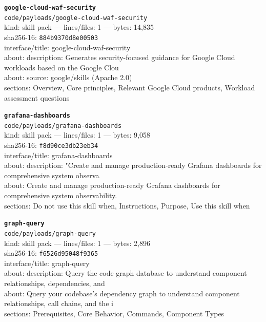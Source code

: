 \noindent\textbf{\texttt{google-cloud-waf-security}}\\
\texttt{code/payloads/google-cloud-waf-security}\\
kind: skill pack --- lines/files: 1 --- bytes: 14,835\\
sha256-16: \texttt{884b9370d8e00503}\\
interface/title: google-cloud-waf-security\\
about: description: Generates security-focused guidance for Google Cloud workloads based on the Google Clou\\
about: source: google/skills (Apache 2.0)\\
sections: Overview, Core principles, Relevant Google Cloud products, Workload assessment questions\\
\vspace*{6.0pt}

\noindent\textbf{\texttt{grafana-dashboards}}\\
\texttt{code/payloads/grafana-dashboards}\\
kind: skill pack --- lines/files: 1 --- bytes: 9,058\\
sha256-16: \texttt{f8d90ce3db23eb34}\\
interface/title: grafana-dashboards\\
about: description: "Create and manage production-ready Grafana dashboards for comprehensive system observa\\
about: Create and manage production-ready Grafana dashboards for comprehensive system observability.\\
sections: Do not use this skill when, Instructions, Purpose, Use this skill when\\
\vspace*{6.0pt}
\newpage

\noindent\textbf{\texttt{graph-query}}\\
\texttt{code/payloads/graph-query}\\
kind: skill pack --- lines/files: 1 --- bytes: 2,896\\
sha256-16: \texttt{f6526d95048f9365}\\
interface/title: graph-query\\
about: description: Query the code graph database to understand component relationships, dependencies, and \\
about: Query your codebase's dependency graph to understand component relationships, call chains, and the i\\
sections: Prerequisites, Core Behavior, Commands, Component Types\\
\vspace*{6.0pt}

